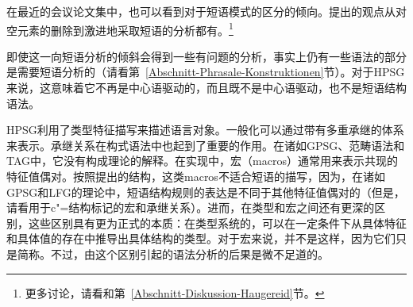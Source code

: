 在最近的会议论文集中，也可以看到对于短语模式的区分的倾向。提出的观点从对空元素的删除到激进地采取短语的分析都有。\footnote{
更多讨论，请看和第~\ref{Abschnitt-Diskussion-Haugereid}节。
}

即使这一向短语分析的倾斜会得到一些有问题的分析，事实上仍有一些语法的部分是需要短语分析的（请看第~\ref{Abschnitt-Phrasale-Konstruktionen}节）。对于HPSG来说，这意味着它不再是中心语驱动的，而且既不是中心语驱动，也不是短语结构语法。

HPSG利用了类型特征描写来描述语言对象。一般化可以通过带有多重承继的体系来表示。承继关系在构式语法\indexcxg 中也起到了重要的作用。在诸如GPSG\indexgpsg 、范畴语法\indexcg  和TAG\indextag 中，它没有构成理论的解释。在实现中，宏（macros）通常用来表示共现的特征值偶对\citep*{DKK2004a}。按照提出的结构，这类macros不适合短语的描写，因为，在诸如GPSG\indexgpsg 和LFG\indexlfg 的理论中，短语结构规则的表达是不同于其他特征值偶对的（但是，请看用于c"=结构标记的宏和承继关系）。进而，在类型和宏之间还有更深的区别，这些区别具有更为正式的本质：在类型系统的，可以在一定条件下从具体特征和具体值的存在中推导出具体结构的类型。对于宏来说，并不是这样，因为它们只是简称。不过，由这个区别引起的语法分析的后果是微不足道的。

